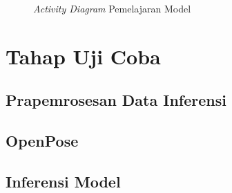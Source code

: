\begin{figure}[htbp]
    \begin{center}
    \end{center}
    \vspace{-20pt}
    \captionsetup{labelfont=bf, textfont=bf}
    \caption{\textit{Activity Diagram} Pemelajaran Model}
    \vspace{-10pt}
    \captionsetup{labelfont=md, textfont=md}
    \label{fig:learning}
\end{figure}

\section{Tahap Uji Coba} \label{sec:3-TahapUjiCoba}

\subsection{Prapemrosesan Data Inferensi}

\subsection{OpenPose}

\subsection{Inferensi Model}


